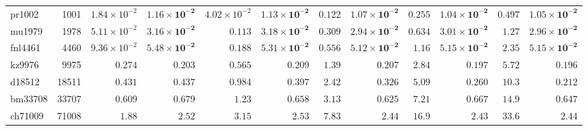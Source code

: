 \begin{table}[t]
{\begin{tabular}{@{}lr*{5}{rr}@{}}
pr1002 & 1001 & $1.84 \times 10^{-2}$ & $\mathbf{1.16 \times 10^{-2}}$ & $4.02 \times 10^{-2}$ & $\mathbf{1.13 \times 10^{-2}}$ & $0.122$ & $\mathbf{1.07 \times 10^{-2}}$ & $0.255$ & $\mathbf{1.04 \times 10^{-2}}$ & $0.497$ & $\mathbf{1.05 \times 10^{-2}}$ \\
mu1979 & 1978 & $5.11 \times 10^{-2}$ & $\mathbf{3.16 \times 10^{-2}}$ & $0.113$ & $\mathbf{3.18 \times 10^{-2}}$ & $0.309$ & $\mathbf{2.94 \times 10^{-2}}$ & $0.634$ & $\mathbf{3.01 \times 10^{-2}}$ & $1.27$ & $\mathbf{2.96 \times 10^{-2}}$ \\
fnl4461 & 4460 & $9.36 \times 10^{-2}$ & $\mathbf{5.48 \times 10^{-2}}$ & $0.188$ & $\mathbf{5.31 \times 10^{-2}}$ & $0.556$ & $\mathbf{5.12 \times 10^{-2}}$ & $1.16$ & $\mathbf{5.15 \times 10^{-2}}$ & $2.35$ & $\mathbf{5.15 \times 10^{-2}}$ \\
kz9976 & 9975 & $0.274$ & $\mathbf{0.203}$ & $0.565$ & $\mathbf{0.209}$ & $1.39$ & $\mathbf{0.207}$ & $2.84$ & $\mathbf{0.197}$ & $5.72$ & $\mathbf{0.196}$ \\
d18512 & 18511 & $\mathbf{0.431}$ & $0.437$ & $0.984$ & $\mathbf{0.397}$ & $2.42$ & $\mathbf{0.326}$ & $5.09$ & $\mathbf{0.260}$ & $10.3$ & $\mathbf{0.212}$ \\
bm33708 & 33707 & $\mathbf{0.609}$ & $0.679$ & $1.23$ & $\mathbf{0.658}$ & $3.13$ & $\mathbf{0.625}$ & $7.21$ & $\mathbf{0.667}$ & $14.9$ & $\mathbf{0.647}$ \\
ch71009 & 71008 & $\mathbf{1.88}$ & $2.52$ & $3.15$ & $\mathbf{2.53}$ & $7.83$ & $\mathbf{2.44}$ & $16.9$ & $\mathbf{2.43}$ & $33.6$ & $\mathbf{2.44}$ \\
\bottomrule
\end{tabular}%
}
\vspace{0.8em}
\end{table}
